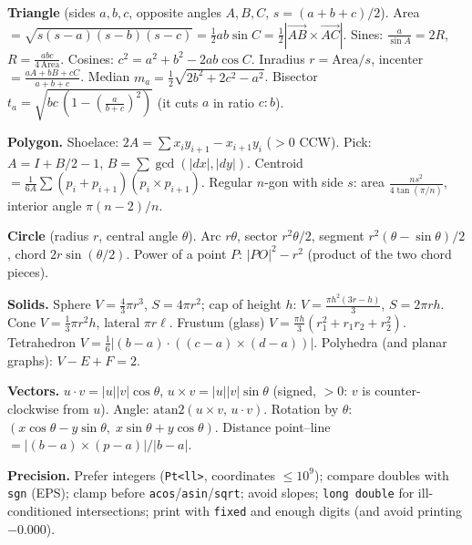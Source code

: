 {\scriptsize
\setlength{\parskip}{2pt}
\textbf{Triangle} (sides $a,b,c$, opposite angles $A,B,C$, $s=(a+b+c)/2$).
Area $=\sqrt{s(s-a)(s-b)(s-c)}=\frac12ab\sin C=\frac12|\vec{AB}\times\vec{AC}|$.
Sines: $\frac{a}{\sin A}=2R$, $R=\frac{abc}{4\,\mathrm{Area}}$. Cosines:
$c^2=a^2+b^2-2ab\cos C$. Inradius $r=\mathrm{Area}/s$, incenter
$=\frac{aA+bB+cC}{a+b+c}$. Median $m_a=\frac12\sqrt{2b^2+2c^2-a^2}$.
Bisector $t_a=\sqrt{bc\,(1-(\frac{a}{b+c})^2)}$ (it cuts $a$ in ratio $c:b$).

\textbf{Polygon.} Shoelace: $2A=\sum x_iy_{i+1}-x_{i+1}y_i$ ($>0$ CCW).
Pick: $A=I+B/2-1$, $B=\sum\gcd(|dx|,|dy|)$. Centroid
$=\frac{1}{6A}\sum(p_i+p_{i+1})(p_i\times p_{i+1})$. Regular $n$-gon with side
$s$: area $\frac{ns^2}{4\tan(\pi/n)}$, interior angle $\pi(n-2)/n$.

\textbf{Circle} (radius $r$, central angle $\theta$). Arc $r\theta$, sector
$r^2\theta/2$, segment $r^2(\theta-\sin\theta)/2$, chord $2r\sin(\theta/2)$.
Power of a point $P$: $|PO|^2-r^2$ (product of the two chord pieces).

\textbf{Solids.} Sphere $V=\frac43\pi r^3$, $S=4\pi r^2$; cap of height $h$:
$V=\frac{\pi h^2(3r-h)}{3}$, $S=2\pi rh$. Cone $V=\frac13\pi r^2h$, lateral
$\pi r\ell$. Frustum (glass) $V=\frac{\pi h}{3}(r_1^2+r_1r_2+r_2^2)$.
Tetrahedron $V=\frac16|(b-a)\cdot((c-a)\times(d-a))|$. Polyhedra (and planar
graphs): $V-E+F=2$.

\textbf{Vectors.} $u\cdot v=|u||v|\cos\theta$, $u\times v=|u||v|\sin\theta$
(signed, $>0$: $v$ is counter-clockwise from $u$). Angle: $\mathrm{atan2}(u\times
v,\,u\cdot v)$. Rotation by $\theta$: $(x\cos\theta-y\sin\theta,\;
x\sin\theta+y\cos\theta)$. Distance point--line $=|(b-a)\times(p-a)|/|b-a|$.

\textbf{Precision.} Prefer integers (\texttt{Pt<ll>}, coordinates $\le
10^9$); compare doubles with \texttt{sgn} (EPS); clamp before
\texttt{acos}/\texttt{asin}/\texttt{sqrt}; avoid slopes; \texttt{long
double} for ill-conditioned intersections; print with \texttt{fixed} and
enough digits (and avoid printing $-0.000$).
}
